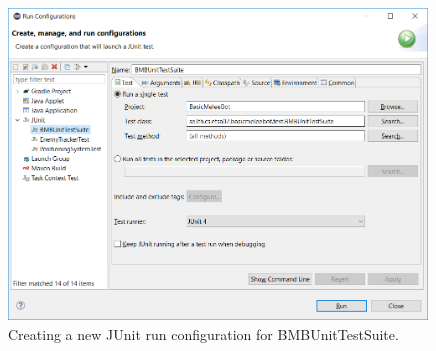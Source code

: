 \documentclass{scrreprt}
\begin{document}
\begin{figure}
\centering
\includegraphics[width=0.99\textwidth]{figures/JUnit-runConfig.png}
\caption{Creating a new JUnit run configuration for BMBUnitTestSuite.}
\label{fig:runConfig}
\end{figure}

\newpage
\end{document}

